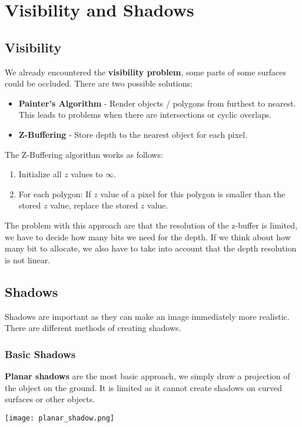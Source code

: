 \section{Visibility and Shadows}


\subsection{Visibility}

We already encountered the \textbf{visibility problem}, some parts of some surfaces could be occluded. There are two possible solutions:
\begin{itemize}
	\item \textbf{Painter's Algorithm} - Render objects / polygons from furthest to nearest. This leads to problems when there are intersections or cyclic overlaps.
	\item \textbf{Z-Buffering} - Store depth to the nearest object for each pixel.
\end{itemize}

The Z-Buffering algorithm works as follows:
\begin{enumerate}
	\item Initialize all $z$ values to $\infty$.
	\item For each polygon: If $z$ value of a pixel for this polygon is smaller than the stored $z$ value, replace the stored $z$ value.
\end{enumerate}

The problem with this approach are that the resolution of the z-buffer is limited, we have to decide how many bits we need for the depth. If we think about how many bit to allocate, we also have to take into account that the depth resolution is not linear.


\subsection{Shadows}

Shadows are important as they can make an image immediately more realistic. There are different methods of creating shadows.

\subsubsection{Basic Shadows}

\textbf{Planar shadows} are the most basic approach, we simply draw a projection of the object on the ground. It is limited as it cannot create shadows on curved surfaces or other objects.
\begin{center}
	\texttt{[image: planar\_shadow.png]}
\end{center}

